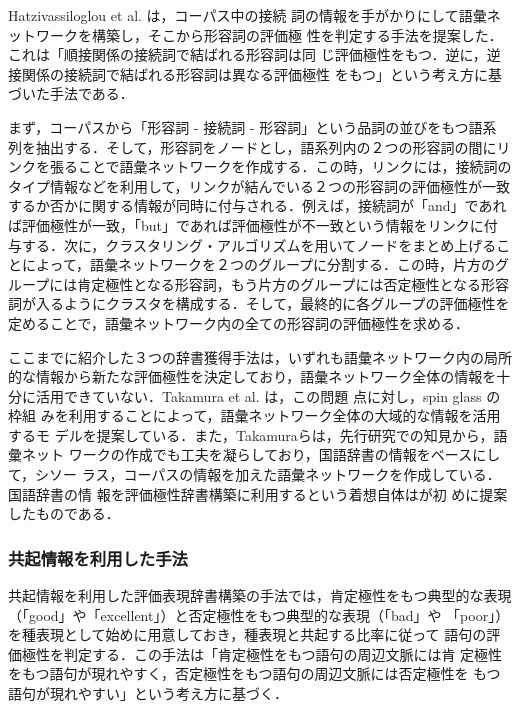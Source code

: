 \vspace{1em}
\underline{\textbf{\cite{hatzivassiloglou1997a}}}
\vspace{1em}

Hatzivassiloglou et al. \cite{hatzivassiloglou1997a}は，コーパス中の接続
詞の情報を手がかりにして語彙ネットワークを構築し，そこから形容詞の評価極
性を判定する手法を提案した．これは「順接関係の接続詞で結ばれる形容詞は同
じ評価極性をもつ．逆に，逆接関係の接続詞で結ばれる形容詞は異なる評価極性
をもつ」という考え方に基づいた手法である．

まず，コーパスから「形容詞 - 接続詞 - 形容詞」という品詞の並びをもつ語系
列を抽出する．そして，形容詞をノードとし，語系列内の２つの形容詞の間にリ
ンクを張ることで語彙ネットワークを作成する．この時，リンクには，接続詞の
タイプ情報などを利用して，リンクが結んでいる２つの形容詞の評価極性が一致
するか否かに関する情報が同時に付与される．例えば，接続詞が「and」であれ
ば評価極性が一致，「but」であれば評価極性が不一致という情報をリンクに付
与する．次に，クラスタリング・アルゴリズムを用いてノードをまとめ上げるこ
とによって，語彙ネットワークを２つのグループに分割する．この時，片方のグ
ループには肯定極性となる形容詞，もう片方のグループには否定極性となる形容
詞が入るようにクラスタを構成する．そして，最終的に各グループの評価極性を
定めることで，語彙ネットワーク内の全ての形容詞の評価極性を求める．

\vspace{1em}

ここまでに紹介した３つの辞書獲得手法は，いずれも語彙ネットワーク内の局所
的な情報から新たな評価極性を決定しており，語彙ネットワーク全体の情報を十
分に活用できていない．Takamura et al. \cite{takamura2005a} は，この問題
点に対し，spin glass \cite{chandler1987a,mackay2003a,inoue2001a} の枠組
みを利用することによって，語彙ネットワーク全体の大域的な情報を活用するモ
デルを提案している．また，Takamuraらは，先行研究での知見から，語彙ネット
ワークの作成でも工夫を凝らしており，国語辞書の情報をベースにして，シソー
ラス，コーパスの情報を加えた語彙ネットワークを作成している．国語辞書の情
報を評価極性辞書構築に利用するという着想自体は\cite{kobayashi2001a}が初
めに提案したものである．

\subsubsection{共起情報を利用した手法}
\label{sec:cooc}

共起情報を利用した評価表現辞書構築の手法では，肯定極性をもつ典型的な表現
（「good」や「excellent」）と否定極性をもつ典型的な表現（「bad」や
「poor」）を種表現として始めに用意しておき，種表現と共起する比率に従って
語句の評価極性を判定する．この手法は「肯定極性をもつ語句の周辺文脈には肯
定極性をもつ語句が現れやすく，否定極性をもつ語句の周辺文脈には否定極性を
もつ語句が現れやすい」という考え方に基づく．

